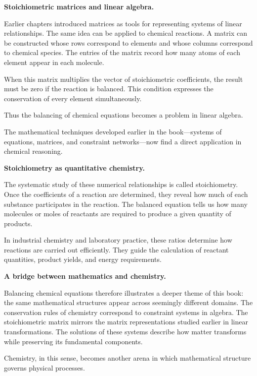 \documentclass[11pt, openany]{book}
\theoremstyle{plain}
\theoremstyle{definition}
\theoremstyle{remark}
\begin{document}
\medskip

\textbf{Stoichiometric matrices and linear algebra.}

Earlier chapters introduced matrices as tools for representing systems
of linear relationships. The same idea can be applied to chemical
reactions. A matrix can be constructed whose rows correspond to
elements and whose columns correspond to chemical species. The entries
of the matrix record how many atoms of each element appear in each
molecule.

When this matrix multiplies the vector of stoichiometric coefficients,
the result must be zero if the reaction is balanced. This condition
expresses the conservation of every element simultaneously.

Thus the balancing of chemical equations becomes a problem in linear
algebra.

The mathematical techniques developed earlier in the book—systems of
equations, matrices, and constraint networks—now find a direct
application in chemical reasoning.

\medskip

\textbf{Stoichiometry as quantitative chemistry.}

The systematic study of these numerical relationships is called
stoichiometry. Once the coefficients of a reaction are determined, they
reveal how much of each substance participates in the reaction. The
balanced equation tells us how many molecules or moles of reactants are
required to produce a given quantity of products.

In industrial chemistry and laboratory practice, these ratios determine
how reactions are carried out efficiently. They guide the calculation of
reactant quantities, product yields, and energy requirements.

\medskip

\textbf{A bridge between mathematics and chemistry.}

Balancing chemical equations therefore illustrates a deeper theme of
this book: the same mathematical structures appear across seemingly
different domains. The conservation rules of chemistry correspond to
constraint systems in algebra. The stoichiometric matrix mirrors the
matrix representations studied earlier in linear transformations. The
solutions of these systems describe how matter transforms while
preserving its fundamental components.

Chemistry, in this sense, becomes another arena in which mathematical
structure governs physical processes.
\end{document}
